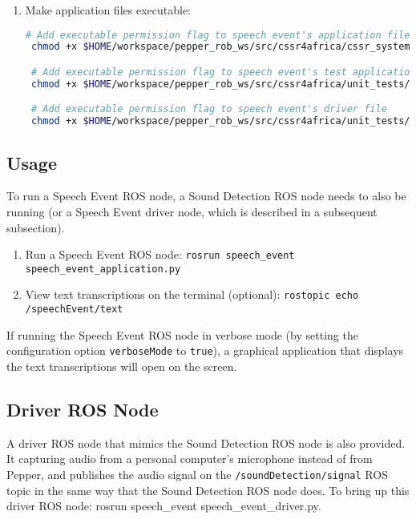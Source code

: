 \documentclass{CSSRforAfrica}
\begin{document}
\begin{enumerate}
\begin{lstlisting}[language=bash]
 # Build the CSSR4Africa project
 catkin_make

 # Source the CSSR4Africa ROS workspace
 source devel/setup.bash
    \end{lstlisting}
    \item Make application files executable:
    \begin{lstlisting}[language=bash]
 # Add executable permission flag to speech event's application file
 chmod +x $HOME/workspace/pepper_rob_ws/src/cssr4africa/cssr_system/speech_event/src/speech_event_application.py

 # Add executable permission flag to speech event's test application file
 chmod +x $HOME/workspace/pepper_rob_ws/src/cssr4africa/unit_tests/speech_event_test/src/speech_event_test_application.py

 # Add executable permission flag to speech event's driver file
 chmod +x $HOME/workspace/pepper_rob_ws/src/cssr4africa/unit_tests/speech_event_test/src/speech_event_driver.py
    \end{lstlisting}
\end{enumerate}

\subsection{Usage}
To run a Speech Event ROS node, a Sound Detection ROS node needs to also be running (or a Speech Event driver node, which is described in a subsequent subsection).

\begin{enumerate}
    \item Run a Speech Event ROS node: \lstinline|rosrun speech_event speech_event_application.py|
    \item View text transcriptions on the terminal (optional): \lstinline|rostopic echo /speechEvent/text|
\end{enumerate}

If running the Speech Event ROS node in verbose mode (by setting the configuration option \texttt{verboseMode} to \texttt{true}), a graphical application that displays the text transcriptions will open on the screen.

\subsection{Driver ROS Node}
A driver ROS node that mimics the Sound Detection ROS node is also provided. It capturing audio from a personal computer's microphone instead of from Pepper, and publishes the audio signal on the \texttt{/soundDetection/signal} ROS topic in the same way that the Sound Detection ROS node does. To bring up this driver ROS node: rosrun speech\_event speech\_event\_driver.py.
\end{document}

